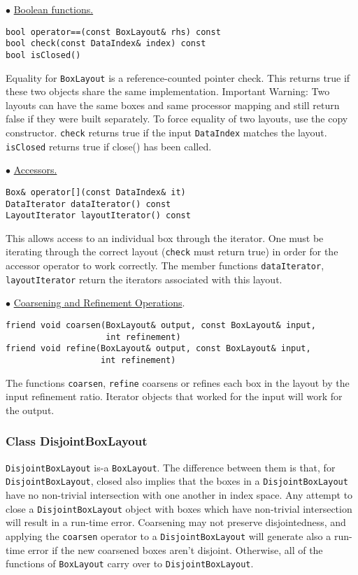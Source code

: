 \begin{trivlist}
\item $\bullet$ \underline{Boolean functions.}
\begin{verbatim} 
bool operator==(const BoxLayout& rhs) const 
bool check(const DataIndex& index) const
bool isClosed()
\end{verbatim}
Equality for {\tt BoxLayout} is a reference-counted  pointer
check.  This returns true if these two objects
share the same implementation. 
Important Warning: 
Two layouts can have the same boxes and same
processor mapping and still return false if they were built
separately.  To force equality of two layouts, use 
the copy constructor.
{\tt check} returns true if the input {\tt DataIndex} matches
the layout. 
{\tt isClosed} returns true if close() has been called.

\item
$\bullet$ \underline{Accessors.}
\begin{verbatim} 
Box& operator[](const DataIndex& it)
DataIterator dataIterator() const
LayoutIterator layoutIterator() const
\end{verbatim}
This allows access to an individual
box through the iterator.  
One must be iterating through the 
correct layout ({\tt check} must return true) in order 
for the accessor operator to work correctly.
The member functions {\tt dataIterator}, {\tt layoutIterator}
return the iterators associated with this layout.

\item $\bullet$ \underline{Coarsening and Refinement Operations}.
\begin{verbatim} 
friend void coarsen(BoxLayout& output, const BoxLayout& input,
                    int refinement)
friend void refine(BoxLayout& output, const BoxLayout& input,
                   int refinement)
\end{verbatim}
The functions {\tt coarsen}, {\tt refine} coarsens or refines each 
box in the layout by the input refinement ratio.
Iterator objects that worked for the input will work for
the output.  
\end{trivlist}
\subsubsection{Class DisjointBoxLayout}
\label{DisjointBoxLayoutSection}


{\tt DisjointBoxLayout} is-a {\tt BoxLayout}. The difference between
them is that, for {\tt DisjointBoxLayout}, closed also implies that
the boxes in a {\tt DisjointBoxLayout} have no non-trivial
intersection with one another in index space.  Any attempt to close a
{\tt DisjointBoxLayout} object with boxes which have non-trivial
intersection will result in a run-time error. Coarsening may not
preserve disjointedness, and applying the {\tt coarsen} operator to a
{\tt DisjointBoxLayout} will generate also a run-time error if the new
coarsened boxes aren't disjoint.  Otherwise, all of the functions of
{\tt BoxLayout} carry over to {\tt DisjointBoxLayout}. 

